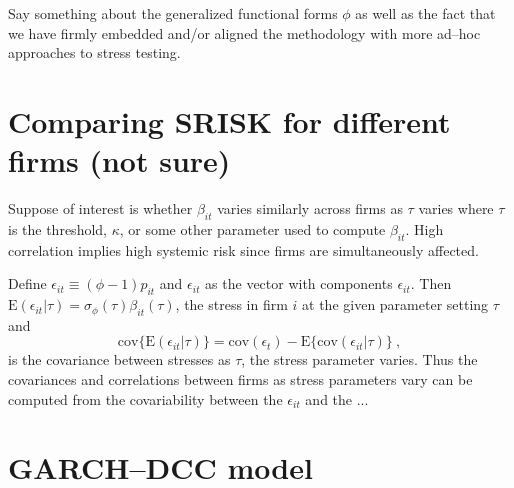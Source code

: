 \documentclass[authoryear]{elsarticle}
\newcommand{\E}{\mathrm{E}}
\newcommand{\e}{\mathrm{e}}
\newcommand{\cov}{\mathrm{cov}}
\newcommand{\eps}{\epsilon}
\newcommand{\Ex}{{\cal E}}
\begin{document}
Say something about the generalized functional forms $\phi$ as well as the fact that we have firmly embedded and/or aligned the methodology with more ad--hoc approaches to stress testing.


\section{Comparing SRISK for different firms (not sure)}

Suppose of interest is whether $\beta_{it}$ varies similarly  across firms as $\tau$ varies where $\tau$ is the threshold, $\kappa$, or some other parameter used to compute $\beta_{it}$. High correlation implies high systemic risk since firms are simultaneously affected.

Define $\eps_{it}\equiv(\phi-1)p_{it}$ and $\eps_{it}$ as the vector with components $\eps_{it}$.  Then $\E(\eps_{it}|\tau)=\sigma_\phi(\tau)\beta_{it}(\tau)$, the stress in firm $i$ at the given parameter setting $\tau$  and
$$
\cov\{\E(\eps_{it}|\tau)\}=\cov(\eps_{t})-\E\{\cov(\eps_{it}|\tau)\}\ ,
$$
is the covariance between stresses as $\tau$, the stress parameter varies.   Thus the covariances and correlations between firms as stress parameters vary can be computed from the covariability between the $\eps_{it}$ and the ...

\appendix
\renewcommand*{\thesection}{\Alph{section}}

\section{GARCH--DCC model}\label{garchdcc}
\end{document}
